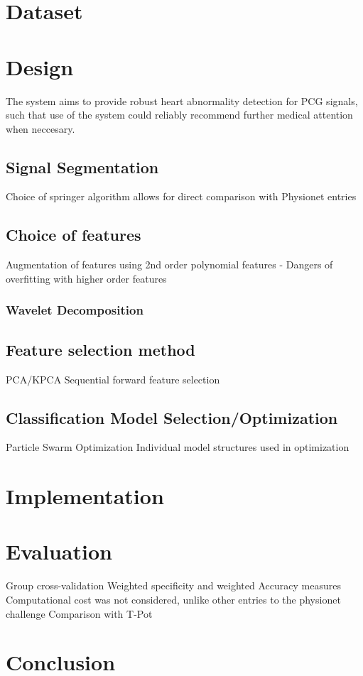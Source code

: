 \documentclass[titlepage, 12pt]{scrartcl} \usepackage{enumitem}
\begin{document}

\section{Dataset}

\section{Design}
The system aims to provide robust heart abnormality detection for PCG signals,
such that use of the system could reliably recommend further medical attention
when neccesary.
\subsection{Signal Segmentation}
Choice of springer algorithm allows for direct comparison with Physionet
entries
\subsection{Choice of features}

Augmentation of features using 2nd order polynomial features
- Dangers of overfitting with higher order features
\subsubsection{Wavelet Decomposition}
\subsection{Feature selection method}
PCA/KPCA
Sequential forward feature selection
\subsection{Classification Model Selection/Optimization}
Particle Swarm Optimization
Individual model structures used in optimization

\section{Implementation}
\section{Evaluation}
Group cross-validation
Weighted specificity and weighted Accuracy measures
Computational cost was not considered, unlike other entries to the physionet
challenge
Comparison with T-Pot
\section{Conclusion}



\pagebreak{}
\printbibliography{}
\end{document}
